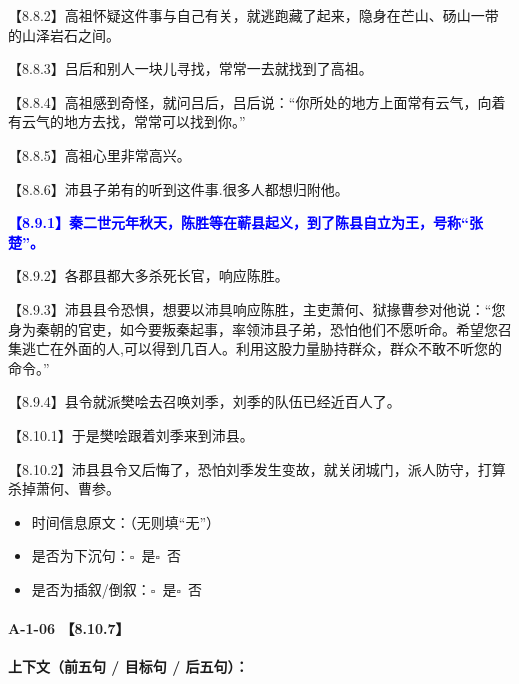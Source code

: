 \documentclass[fontset=none,11pt,a4paper]{ctexart}
\newcommand{\answerline}[1]{\underline{\hspace{#1}}}
\newcommand{\choicebox}[1]{$\square$~#1}
\begin{document}
\noindent 【8.8.2】高祖怀疑这件事与自己有关，就逃跑藏了起来，隐身在芒山、砀山一带的山泽岩石之间。\par
\noindent 【8.8.3】吕后和别人一块儿寻找，常常一去就找到了高祖。\par
\noindent 【8.8.4】高祖感到奇怪，就问吕后，吕后说：“你所处的地方上面常有云气，向着有云气的地方去找，常常可以找到你。”\par
\noindent 【8.8.5】高祖心里非常高兴。\par
\noindent 【8.8.6】沛县子弟有的听到这件事.很多人都想归附他。\par
\noindent \textcolor{blue}{\textbf{【8.9.1】秦二世元年秋天，陈胜等在蕲县起义，到了陈县自立为王，号称“张楚”。}}\par
\noindent 【8.9.2】各郡县都大多杀死长官，响应陈胜。\par
\noindent 【8.9.3】沛县县令恐惧，想要以沛具响应陈胜，主吏萧何、狱掾曹参对他说：“您身为秦朝的官吏，如今要叛秦起事，率领沛县子弟，恐怕他们不愿听命。希望您召集逃亡在外面的人,可以得到几百人。利用这股力量胁持群众，群众不敢不听您的命令。”\par
\noindent 【8.9.4】县令就派樊哙去召唤刘季，刘季的队伍已经近百人了。\par
\noindent 【8.10.1】于是樊哙跟着刘季来到沛县。\par
\noindent 【8.10.2】沛县县令又后悔了，恐怕刘季发生变故，就关闭城门，派人防守，打算杀掉萧何、曹参。\par

\begin{itemize}
  \item 时间信息原文：\answerline{7.5cm}（无则填“无”）
  \item 是否为下沉句：\choicebox{是}\quad \choicebox{否}
  \item 是否为插叙/倒叙：\choicebox{是}\quad \choicebox{否}
\end{itemize}

\paragraph{A-1-06 \quad 【8.10.7】}
\textbf{上下文（前五句 / 目标句 / 后五句）：}
\end{document}

